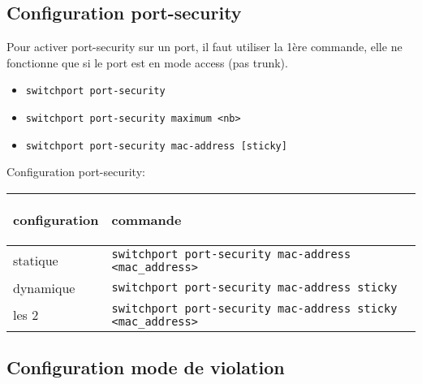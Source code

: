\documentclass[a4paper]{article}
\begin{document}
\subsection{Configuration port-security}



Pour activer port-security sur un port, il faut utiliser la 1ère commande, elle ne fonctionne que si le port est en mode access (pas trunk).
\begin{itemize}[label=\textbf{–}]
    \item \texttt{switchport port-security}
    \item \texttt{switchport port-security maximum <nb>}
    \item \texttt{switchport port-security mac-address [sticky]}
\end{itemize}
Configuration port-security:
\begin{center}
    \begin{tabular}{|p{3cm}|p{12cm}|} \hline
        \begin{center} \textbf{configuration} \end{center} &
        \begin{center} \textbf{commande} \end{center} \\ \hline
        statique & \texttt{switchport port-security mac-address <mac\_address>} \\
        dynamique & \texttt{switchport port-security mac-address sticky} \\
        les 2 & \texttt{switchport port-security mac-address sticky <mac\_address>} \\ \hline
    \end{tabular}
\end{center}





\subsection{Configuration mode de violation}
\end{document}
